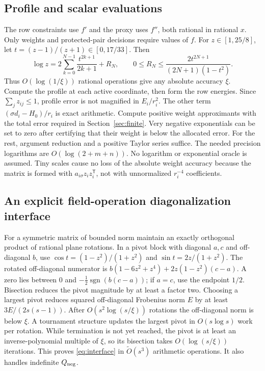 \documentclass[11pt]{amsart}
\theoremstyle{remark}\newtheorem{remark}[theorem]{Remark}
\newcommand{\T}{\mathsf T}
\begin{document}
\subsection{Profile and scalar evaluations}
The row constraints use $f'$ and the proxy uses $f''$, both rational in
rational $x$. Only weights and protected-pair decisions require values of
$f$. For $z\in[1,25/8]$, let $t=(z-1)/(z+1)\in[0,17/33]$. Then
\[
 \log z=2\sum_{k=0}^{N-1}\frac{t^{2k+1}}{2k+1}+R_N,
 \qquad 0\le R_N\le\frac{2t^{2N+1}}{(2N+1)(1-t^2)}.
\]
Thus $O(\log(1/\xi))$ rational operations give any absolute accuracy
$\xi$. Compute the profile at each active coordinate, then form the row
energies. Since $\sum_jz_{ij}\le1$, profile error is not magnified in
$E_i/r_i^2$. The other term $(\sigma d_i-H_0)/r_i$ is exact arithmetic.
Compute positive weight approximants with the total error required in
Section~\ref{sec:finite}. Very negative exponentials can be set to zero
after certifying that their weight is below the allocated error.
For the rest, argument reduction and a positive Taylor series suffice.
The needed precision logarithms are $O(\log(2+m+n))$. No logarithm or
exponential oracle is assumed. Tiny scales cause no loss of the absolute
weight accuracy because the matrix is formed with $a_{i\sigma}z_iz_i^\T$,
not with unnormalized $r_i^{-4}$ coefficients.

\subsection{An explicit field-operation diagonalization interface}
For a symmetric matrix of bounded norm maintain an exactly orthogonal
product of rational plane rotations. In a pivot block with diagonal
$a,c$ and off-diagonal $b$, use
$\cos t=(1-z^2)/(1+z^2)$ and $\sin t=2z/(1+z^2)$.
The rotated off-diagonal numerator is
$b(1-6z^2+z^4)+2z(1-z^2)(c-a)$.
A zero lies between $0$ and
$-\tfrac12\operatorname{sgn}(b(c-a))$; if $a=c$, use the endpoint $1/2$.
Bisection reduces the pivot magnitude by at least a factor two.
Choosing a largest pivot reduces squared off-diagonal Frobenius norm
$E$ by at least $3E/(2s(s-1))$.
After $O(s^2\log(s/\xi))$ rotations the off-diagonal norm is below $\xi$.
A tournament structure updates the largest pivot in $O(s\log s)$ work
per rotation. While termination is not yet reached, the pivot is at least
an inverse-polynomial multiple of $\xi$, so its bisection takes
$O(\log(s/\xi))$ iterations. This proves
\eqref{eq:interface} in $\widetilde O(s^3)$ arithmetic operations.
It also handles indefinite $Q_{\rm neg}$.
\end{document}
